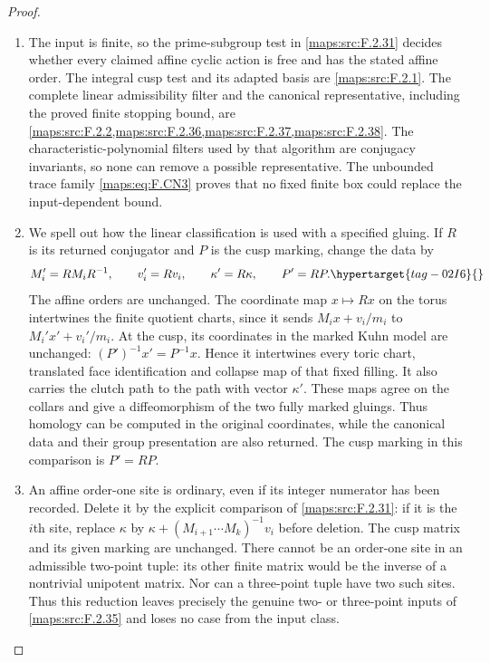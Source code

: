 \documentclass[11pt,a4paper]{article}
\numberwithin{equation}{section}
\theoremstyle{definition}
\begin{document}
\begin{proof}
\begin{enumerate}[label=\arabic*.]
\item The input is finite, so the prime-subgroup test in \ref{maps:src:F.2.31}
decides whether every claimed affine cyclic action is free
and has the stated affine order.  The integral cusp test and
its adapted basis are \ref{maps:src:F.2.1}.  The complete linear admissibility
filter and the canonical representative, including the proved
finite stopping bound, are \cref{maps:src:F.2.2,maps:src:F.2.36,maps:src:F.2.37,maps:src:F.2.38}.  The
characteristic-polynomial filters used by that algorithm are
conjugacy invariants, so none can remove a possible
representative.  The unbounded trace family \eqref{maps:eq:F.CN3} proves
that no fixed finite box could replace the input-dependent
bound.

\item We spell out how the linear classification is used with a
specified gluing.  If $R$ is its returned conjugator and
$P$ is the cusp marking, change the data by
\begin{equation}
 M_i'=RM_iR^{-1},\qquad v_i'=Rv_i,\qquad
 \kappa'=R\kappa,\qquad P'=RP.                           \hypertarget{tag-02I6}{}\label{maps:eq:F.SY1}
\end{equation}
The affine orders are unchanged.  The coordinate map
$x\mapsto Rx$ on the torus intertwines the finite quotient
charts, since it sends $M_ix+v_i/m_i$ to
$M_i'x'+v_i'/m_i$.  At the cusp, its coordinates in the
marked Kuhn model are unchanged:
$(P')^{-1}x'=P^{-1}x$.  Hence it intertwines every toric
chart, translated face identification and collapse map of
that fixed filling.  It also carries the clutch path to
the path with vector $\kappa'$.  These maps agree on the
collars and give a diffeomorphism of the two fully marked
gluings.  Thus homology can be computed in the original
coordinates, while the canonical data and their group
presentation are also returned. The cusp marking in this
comparison is $P'=RP$.

\item An affine order-one site is ordinary, even if its integer
numerator has been recorded.  Delete it by the explicit comparison of \cref{maps:src:F.2.31}: if it is the $i$th site, replace
$\kappa$ by
$\kappa+(M_{i+1}\cdots M_k)^{-1}v_i$ before deletion.
The cusp matrix and its given marking are unchanged.
There cannot be an order-one site in an admissible two-point
tuple: its other finite matrix would be the inverse of a
nontrivial unipotent matrix.  Nor can a three-point tuple
have two such sites.  Thus this reduction leaves precisely
the genuine two- or three-point inputs of \ref{maps:src:F.2.35} and loses
no case from the input class.


\end{enumerate}
\end{proof}
\end{document}
